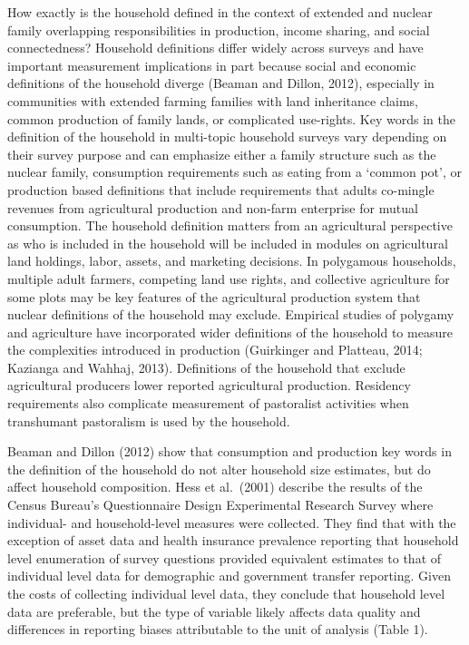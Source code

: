 \documentclass[
]{book}
\begin{document}
How exactly is the household defined in the context of extended and nuclear family overlapping responsibilities in production, income sharing, and social connectedness? Household definitions differ widely across surveys and have important measurement implications in part because social and economic definitions of the household diverge (Beaman and Dillon, 2012), especially in communities with extended farming families with land inheritance claims, common production of family lands, or complicated use-rights. Key words in the definition of the household in multi-topic household surveys vary depending on their survey purpose and can emphasize either a family structure such as the nuclear family, consumption requirements such as eating from a `common pot', or production based definitions that include requirements that adults co-mingle revenues from agricultural production and non-farm enterprise for mutual consumption. The household definition matters from an agricultural perspective as who is included in the household will be included in modules on agricultural land holdings, labor, assets, and marketing decisions. In polygamous households, multiple adult farmers, competing land use rights, and collective agriculture for some plots may be key features of the agricultural production system that nuclear definitions of the household may exclude. Empirical studies of polygamy and agriculture have incorporated wider definitions of the household to measure the complexities introduced in production (Guirkinger and Platteau, 2014; Kazianga and Wahhaj, 2013). Definitions of the household that exclude agricultural producers lower reported agricultural production. Residency requirements also complicate measurement of pastoralist activities when transhumant pastoralism is used by the household.

Beaman and Dillon (2012) show that consumption and production key words in the definition of the household do not alter household size estimates, but do affect household composition. Hess et al.~(2001) describe the results of the Census Bureau's Questionnaire Design Experimental Research Survey where individual- and household-level measures were collected. They find that with the exception of asset data and health insurance prevalence reporting that household level enumeration of survey questions provided equivalent estimates to that of individual level data for demographic and government transfer reporting. Given the costs of collecting individual level data, they conclude that household level data are preferable, but the type of variable likely affects data quality and differences in reporting biases attributable to the unit of analysis (Table 1).
\end{document}
